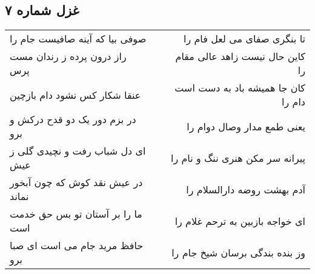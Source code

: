\begin{center}
\section*{غزل شماره ۷}
\label{sec:sh007}
\begin{longtable}{l p{0.5cm} r}
صوفی بیا که آینه صافیست جام را
&&
تا بنگری صفای می لعل فام را
\\
راز درون پرده ز رندان مست پرس
&&
کاین حال نیست زاهد عالی مقام را
\\
عنقا شکار کس نشود دام بازچین
&&
کان جا همیشه باد به دست است دام را
\\
در بزم دور یک دو قدح درکش و برو
&&
یعنی طمع مدار وصال دوام را
\\
ای دل شباب رفت و نچیدی گلی ز عیش
&&
پیرانه سر مکن هنری ننگ و نام را
\\
در عیش نقد کوش که چون آبخور نماند
&&
آدم بهشت روضه دارالسلام را
\\
ما را بر آستان تو بس حق خدمت است
&&
ای خواجه بازبین به ترحم غلام را
\\
حافظ مرید جام می است ای صبا برو
&&
وز بنده بندگی برسان شیخ جام را
\\
\end{longtable}
\end{center}
